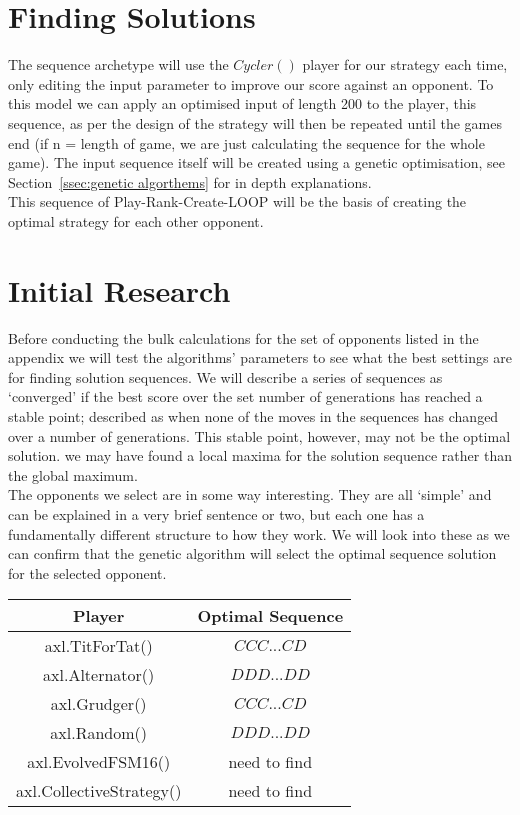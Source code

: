 \section{Finding Solutions}\label{sec:findingSolutions}
The sequence archetype will use the \(Cycler()\) player for our strategy each time, only editing the input parameter to improve our score against an opponent.
To this model we can apply an optimised input of length 200 to the player, this sequence, as per the design of the strategy will then be repeated until the games end (if n = length of game, we are just calculating the sequence for the whole game).
The input sequence itself will be created using a genetic optimisation, see Section~\ref{ssec:genetic algorthems} for in depth explanations.\\

This sequence of Play-Rank-Create-LOOP will be the basis of creating the optimal strategy for each other opponent.

\section{Initial Research}\label{sec:initialResearch}
Before conducting the bulk calculations for the set of opponents listed in the appendix we will test the algorithms' parameters to see what the best settings are for finding solution sequences.
We will describe a series of sequences as `converged' if the best score over the set number of generations has reached a stable point; described as when none of the moves in the sequences has changed over a number of generations.
This stable point, however, may not be the optimal solution.
we may have found a local maxima for the solution sequence rather than the global maximum. \\

The opponents we select are in some way interesting.
They are all `simple' and can be explained in a very brief sentence or two, but each one has a fundamentally different structure to how they work.
We will look into these as we can confirm that the genetic algorithm will select the optimal sequence solution for the selected opponent. \\

\begin{center}
    \begin{tabular}{|c|c|} 
    \hline
    Player & Optimal Sequence \\
    \hline
    axl.TitForTat()&\(CCC...CD\)\\
    axl.Alternator()&\(DDD...DD\)\\
    axl.Grudger()&\(CCC...CD\)\\
    axl.Random()&\(DDD...DD\)\\
    axl.EvolvedFSM16()&need to find\\
    axl.CollectiveStrategy()&need to find\\
    \hline
    \end{tabular}
\end{center}

